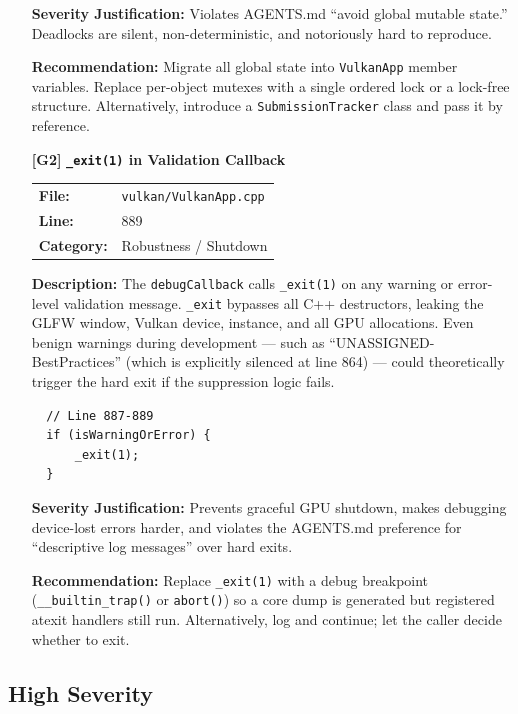 \documentclass[a4paper,12pt]{article}
\newcommand{\severitybox}[2]{%
  \colorbox{#1}{\makebox[2.5cm][c]{\textcolor{white}{\textbf{#2}}}}%
}
\begin{document}
\begin{enumerate}[leftmargin=*]
  \textbf{Severity Justification:} Violates AGENTS.md ``avoid global mutable
  state.'' Deadlocks are silent, non-deterministic, and notoriously hard to
  reproduce.

  \textbf{Recommendation:}
  Migrate all global state into \texttt{VulkanApp} member variables. Replace
  per-object mutexes with a single ordered lock or a lock-free structure.
  Alternatively, introduce a \texttt{SubmissionTracker} class and pass it
  by reference.

\item[\textbf{[G2]}] \textbf{\texttt{\_exit(1)} in Validation Callback}
  \hfill \severitybox{criticalcolor}{CRITICAL}

  \begin{tabular}{ll}
    \textbf{File:} & \texttt{vulkan/VulkanApp.cpp} \\
    \textbf{Line:} & 889 \\
    \textbf{Category:} & Robustness / Shutdown \\
  \end{tabular}

  \textbf{Description:}
  The \texttt{debugCallback} calls \texttt{\_exit(1)} on any warning or
  error-level validation message. \texttt{\_exit} bypasses all C++ destructors,
  leaking the GLFW window, Vulkan device, instance, and all GPU allocations.
  Even benign warnings during development — such as
  ``UNASSIGNED-BestPractices'' (which is explicitly silenced at line 864) —
  could theoretically trigger the hard exit if the suppression logic fails.

  \begin{lstlisting}
  // Line 887-889
  if (isWarningOrError) {
      _exit(1);
  }
  \end{lstlisting}

  \textbf{Severity Justification:} Prevents graceful GPU shutdown, makes
  debugging device-lost errors harder, and violates the AGENTS.md preference
  for ``descriptive log messages'' over hard exits.

  \textbf{Recommendation:}
  Replace \texttt{\_exit(1)} with a debug breakpoint (\texttt{\_\_builtin\_trap()}
  or \texttt{abort()}) so a core dump is generated but registered atexit
  handlers still run. Alternatively, log and continue; let the caller decide
  whether to exit.

\end{enumerate}

\newpage

\subsection{High Severity}
\end{document}
